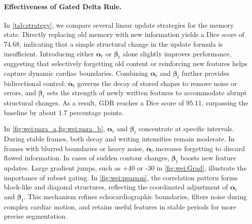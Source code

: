 \paragraph{Effectiveness of Gated Delta Rule.}
In \cref{tab:strategy}, we compare several linear update strategies for the memory state. 
Directly replacing old memory with new information yields a Dice score of 74.68, indicating that a simple structural change in the update formula is insufficient. Introducing either $\boldsymbol{\alpha}_t$ or $\boldsymbol{\beta}_t$ alone slightly improves performance, suggesting that selectively forgetting old content or reinforcing new features helps capture dynamic cardiac boundaries. Combining $\boldsymbol{\alpha}_t$ and $\boldsymbol{\beta}_t$ further provides bidirectional control: $\boldsymbol{\alpha}_t$ governs the decay of stored shapes to remove noise or errors, and $\boldsymbol{\beta}_t$ sets the strength of newly written features to accommodate abrupt structural changes. 
As a result, GDR reaches a Dice score of 95.11, surpassing the baseline by about 1.7 percentage points.

In \cref{fig:wei:para_a,fig:wei:para_b}, $\boldsymbol{\alpha}_t$ and $\boldsymbol{\beta}_t$ concentrate at specific intervals. During stable frames, both decay and writing intensities remain moderate. In frames with blurred boundaries or heavy noise, $\boldsymbol{\alpha}_t$ increases forgetting to discard flawed information. In cases of sudden contour changes, $\boldsymbol{\beta}_t$ boosts new feature updates. Large gradient jumps, such as +40 or -30 in \cref{fig:wei:Grad}, illustrate the importance of robust gating. In \cref{fig:wei:pearson}, the correlation pattern forms block-like and diagonal structures, reflecting the coordinated adjustment of $\boldsymbol{\alpha}_t$ and $\boldsymbol{\beta}_t$. This mechanism refines echocardiographic boundaries, filters noise during complex cardiac motion, and retains useful features in stable periods for more precise segmentation.